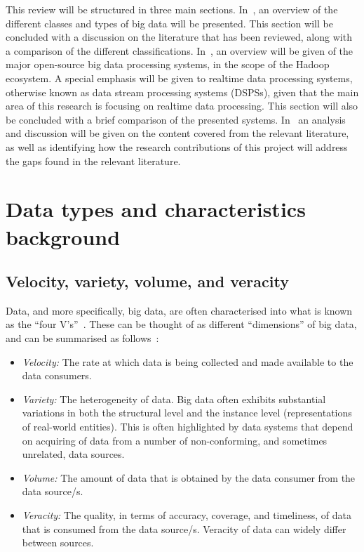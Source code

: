 \documentclass[a4paper,11pt]{article}
\begin{document}
This review will be structured in three main sections. In~, an overview of the
different classes and types of big data will be presented. This section will be concluded with a discussion on the
literature that has been reviewed, along with a comparison of the different classifications.
In~, an overview will be given of the major open-source big data processing
systems, in the scope of the Hadoop ecosystem. A special emphasis will be given to realtime data processing systems,
otherwise known as data stream processing systems (DSPSs), given that the main area of this research is focusing on
realtime data processing. This section will also be concluded with a brief comparison of the presented systems.
In~ an analysis and discussion will be given on the content covered from the relevant
literature, as well as identifying how the research contributions of this project will address the gaps found in the
relevant literature.


\newpage


\section{Data types and characteristics background} %
\label{sec:big_data_types_background}

\subsection{Velocity, variety, volume, and veracity} %
\label{sub:four_v}

Data, and more specifically, big data, are often characterised into what is known as the ``four
V's''~\cite{wang2014bigdatabench}. These can be thought of as different ``dimensions'' of big data, and can be
summarised as follows~\cite{dong2013big}:

\begin{itemize}
  \item \emph{Velocity:} The rate at which data is being collected and made available to the data consumers.
  \item \emph{Variety:} The heterogeneity of data. Big data often exhibits substantial variations in both the structural
  level and the instance level (representations of real-world entities). This is often highlighted by data systems that
  depend on acquiring of data from a number of non-conforming, and sometimes unrelated, data sources.
  \item \emph{Volume:} The amount of data that is obtained by the data consumer from the data source/s.
  \item \emph{Veracity:} The quality, in terms of accuracy, coverage, and timeliness, of data that is consumed from
  the data source/s. Veracity of data can widely differ between sources.
\end{itemize}
\end{document}
